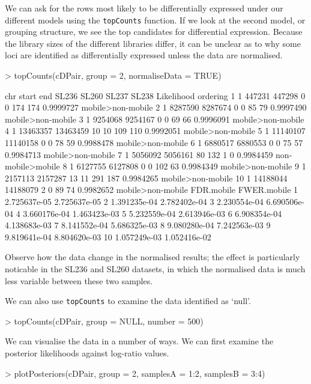 \documentclass[a4paper]{article}
\begin{document}
We can ask for the rows most likely to be differentially expressed under our different models using the \verb'topCounts' function. If we look at the second model, or grouping structure, we see the top candidates for differential expression. Because the library sizes of the different libraries differ, it can be unclear as to why some loci are identified as differentially expressed unless the data are normalised.
\begin{Schunk}
\begin{Sinput}
> topCounts(cDPair, group = 2, normaliseData = TRUE)
\end{Sinput}
\begin{Soutput}
   chr    start      end SL236 SL260 SL237 SL238 Likelihood          ordering
1    1   447231   447298     0     0   174   174  0.9999727 mobile>non-mobile
2    1  8287590  8287674     0     0    85    79  0.9997490 mobile>non-mobile
3    1  9254068  9254167     0     0    69    66  0.9996091 mobile>non-mobile
4    1 13463357 13463459    10    10   109   110  0.9992051 mobile>non-mobile
5    1 11140107 11140158     0     0    78    59  0.9988478 mobile>non-mobile
6    1  6880517  6880553     0     0    75    57  0.9984713 mobile>non-mobile
7    1  5056092  5056161    80   132     1     0  0.9984459 non-mobile>mobile
8    1  6127755  6127808     0     0   102    63  0.9984349 mobile>non-mobile
9    1  2157113  2157287    13    11   291   187  0.9984265 mobile>non-mobile
10   1 14188044 14188079     2     0    89    74  0.9982652 mobile>non-mobile
     FDR.mobile  FWER.mobile
1  2.725637e-05 2.725637e-05
2  1.391235e-04 2.782402e-04
3  2.230554e-04 6.690506e-04
4  3.660176e-04 1.463423e-03
5  5.232559e-04 2.613946e-03
6  6.908354e-04 4.138683e-03
7  8.141552e-04 5.686325e-03
8  9.080280e-04 7.242563e-03
9  9.819641e-04 8.804620e-03
10 1.057249e-03 1.052416e-02
\end{Soutput}
\end{Schunk}
Observe how the data change in the normalised results; the effect is particularly noticable in the SL236 and SL260 datasets, in which the normalised data is much less variable between these two samples.

We can also use \verb'topCounts' to examine the data identified as `null'.
\begin{Schunk}
\begin{Sinput}
> topCounts(cDPair, group = NULL, number = 500)
\end{Sinput}
\end{Schunk}

 We can visualise the data in a number of ways. We can first examine the posterior likelihoods against log-ratio values.
\begin{Schunk}
\begin{Sinput}
> plotPosteriors(cDPair, group = 2, samplesA = 1:2, samplesB = 3:4)
\end{Sinput}
\end{Schunk}
\end{document}
